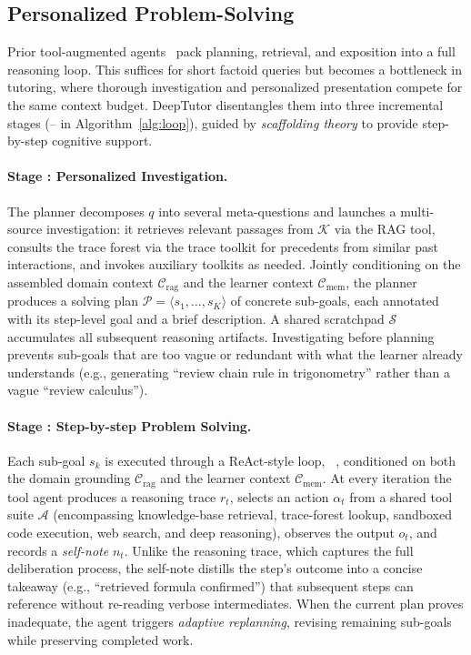 \subsection{Personalized Problem-Solving}
\label{sec:solve}

Prior tool-augmented agents~\citep{yao2023reactsynergizingreasoningacting, chen2026iterresearch} pack planning, retrieval, and exposition into a full reasoning loop.
This suffices for short factoid queries but becomes a bottleneck in tutoring, where thorough investigation and personalized presentation compete for the same context budget.
DeepTutor disentangles them into three incremental stages (-- in Algorithm~\ref{alg:loop}), guided by \textit{scaffolding theory} to provide step-by-step cognitive support.

\paragraph{Stage : Personalized Investigation.}
The planner decomposes $q$ into several meta-questions and launches a multi-source investigation: it retrieves relevant passages from $\mathcal{K}$ via the RAG tool, consults the trace forest via the trace toolkit for precedents from similar past interactions, and invokes auxiliary toolkits as needed.
Jointly conditioning on the assembled domain context $\mathcal{C}_{\text{rag}}$ and the learner context $\mathcal{C}_{\text{mem}}$, the planner produces a solving plan $\mathcal{P} = \langle s_1, \ldots, s_K \rangle$ of concrete sub-goals, each annotated with its step-level goal and a brief description.
A shared scratchpad $\mathcal{S}$ accumulates all subsequent reasoning artifacts.
Investigating before planning prevents sub-goals that are too vague or redundant with what the learner already understands (e.g., generating ``review chain rule in trigonometry'' rather than a vague ``review calculus'').

\paragraph{Stage : Step-by-step Problem Solving.}
Each sub-goal $s_k$ is executed through a ReAct-style loop, ~\citep{yao2023reactsynergizingreasoningacting}, conditioned on both the domain grounding $\mathcal{C}_{\text{rag}}$ and the learner context $\mathcal{C}_{\text{mem}}$.
At every iteration the tool agent produces a reasoning trace $r_t$, selects an action $\alpha_t$ from a shared tool suite $\mathcal{A}$ (encompassing knowledge-base retrieval, trace-forest lookup, sandboxed code execution, web search, and deep reasoning), observes the output $o_t$, and records a \emph{self-note} $n_t$.
Unlike the reasoning trace, which captures the full deliberation process, the self-note distills the step's outcome into a concise takeaway (e.g., ``retrieved formula confirmed'') that subsequent steps can reference without re-reading verbose intermediates.
When the current plan proves inadequate, the agent triggers \emph{adaptive replanning}, revising remaining sub-goals while preserving completed work.

